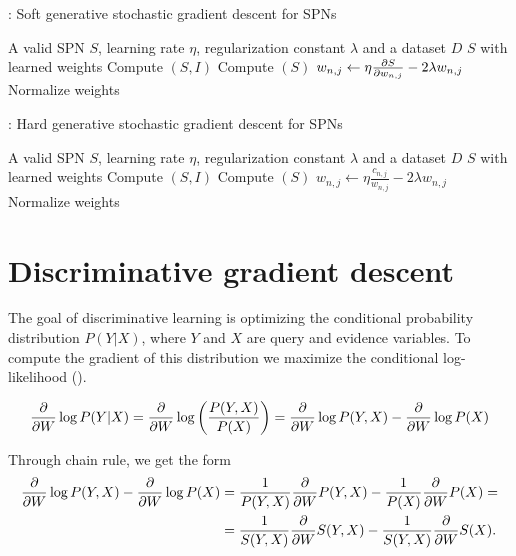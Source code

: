 \begin{algorithm}[H]
  \caption{: Soft generative stochastic gradient descent for SPNs\label{alg:gen_soft_gd}}
  \begin{algorithmic}[1]
    \Require A valid SPN $S$, learning rate $\eta$, regularization constant $\lambda$ and a dataset $D$
    \Ensure $S$ with learned weights
    \Repeat%
        \State Compute $(S, I)$
        \State Compute $(S)$
          \State $w_{n,j}\gets\eta\frac{\partial S}{\partial w_{n,j}}-2\lambda w_{n,j}$
        \EndFor%
        \State Normalize weights
      \EndFor%
  \end{algorithmic}
\end{algorithm}

\begin{algorithm}[H]
  \caption{: Hard generative stochastic gradient descent for SPNs\label{alg:gen_hard_gd}}
  \begin{algorithmic}[1]
    \Require A valid SPN $S$, learning rate $\eta$, regularization constant $\lambda$ and a dataset $D$
    \Ensure $S$ with learned weights
    \Repeat%
        \State Compute $(S, I)$
        \State Compute $(S)$
          \State $w_{n,j}\gets\eta\frac{c_{n,j}}{w_{n,j}}-2\lambda w_{n,j}$
        \EndFor%
        \State Normalize weights
      \EndFor%
  \end{algorithmic}
\end{algorithm}

\section{Discriminative gradient descent}

The goal of discriminative learning is optimizing the conditional probability distribution
$P(Y|X)$, where $Y$ and $X$ are query and evidence variables. To compute the gradient of this
distribution we maximize the conditional log-likelihood (\cite{discriminative}).

\begin{equation*}
  \frac{\partial}{\partial W}\log P(Y|X)=\frac{\partial}{\partial W}\log\left(\frac{P(Y,X)}{P(X)}\right)=
    \frac{\partial}{\partial W}\log P(Y,X)-\frac{\partial}{\partial W}\log P(X)
\end{equation*}

Through chain rule, we get the form
\begin{align*}
  \frac{\partial}{\partial W}\log P(Y,X)-\frac{\partial}{\partial W}\log P(X)&=\frac{1}{P(Y,X)}\frac{\partial}{\partial W}P(Y,X)-\frac{1}{P(X)}
    \frac{\partial}{\partial W}P(X)=\\
    &=\frac{1}{S(Y,X)}\frac{\partial}{\partial W}S(Y,X)-\frac{1}{S(Y,X)}\frac{\partial}{\partial W}S(X).
\end{align*}

